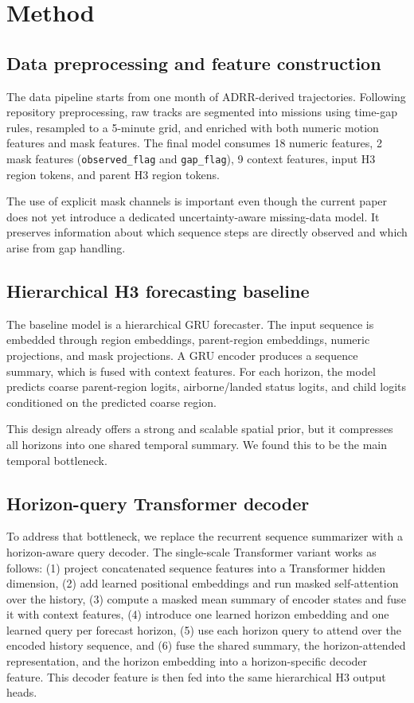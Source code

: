 \section{Method}

\subsection{Data preprocessing and feature construction}

The data pipeline starts from one month of ADRR-derived trajectories. Following repository preprocessing, raw tracks are segmented into missions using time-gap rules, resampled to a 5-minute grid, and enriched with both numeric motion features and mask features. The final model consumes 18 numeric features, 2 mask features (\texttt{observed\_flag} and \texttt{gap\_flag}), 9 context features, input H3 region tokens, and parent H3 region tokens.

The use of explicit mask channels is important even though the current paper does not yet introduce a dedicated uncertainty-aware missing-data model. It preserves information about which sequence steps are directly observed and which arise from gap handling.

\subsection{Hierarchical H3 forecasting baseline}

The baseline model is a hierarchical GRU forecaster. The input sequence is embedded through region embeddings, parent-region embeddings, numeric projections, and mask projections. A GRU encoder produces a sequence summary, which is fused with context features. For each horizon, the model predicts coarse parent-region logits, airborne/landed status logits, and child logits conditioned on the predicted coarse region.

This design already offers a strong and scalable spatial prior, but it compresses all horizons into one shared temporal summary. We found this to be the main temporal bottleneck.

\subsection{Horizon-query Transformer decoder}

To address that bottleneck, we replace the recurrent sequence summarizer with a horizon-aware query decoder. The single-scale Transformer variant works as follows: (1) project concatenated sequence features into a Transformer hidden dimension, (2) add learned positional embeddings and run masked self-attention over the history, (3) compute a masked mean summary of encoder states and fuse it with context features, (4) introduce one learned horizon embedding and one learned query per forecast horizon, (5) use each horizon query to attend over the encoded history sequence, and (6) fuse the shared summary, the horizon-attended representation, and the horizon embedding into a horizon-specific decoder feature. This decoder feature is then fed into the same hierarchical H3 output heads.

